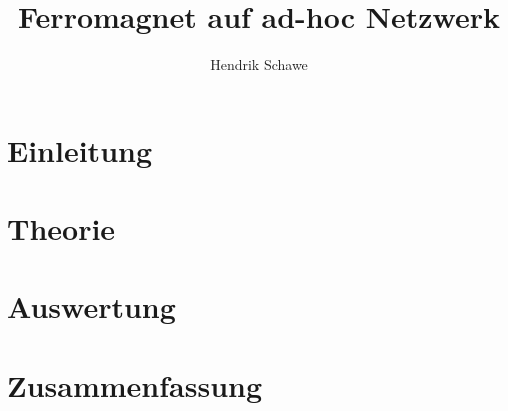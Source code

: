 \documentclass[a4paper,12pt,titlepage,twoside]{scrartcl}
\title{Ferromagnet auf ad-hoc Netzwerk}
\author{Hendrik Schawe}
\date{}
\begin{document}
    \maketitle

    \cleardoublepage
    \tableofcontents

    \clearpage
    \section{Einleitung}

    \section{Theorie}
        

    \section{Auswertung}

    \section{Zusammenfassung}

    
    
\end{document}
